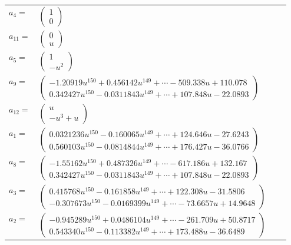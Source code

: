 \documentclass[1p]{elsarticle_modified}
\theoremstyle{definition}
\begin{document}
\begin{tabular}{m{7pt} m{180pt} m{7pt} m{180pt} }
\flushright $a_{4}=$&$\begin{pmatrix}1\\0\end{pmatrix}$ \\
\flushright $a_{11}=$&$\begin{pmatrix}0\\u\end{pmatrix}$ \\
\flushright $a_{5}=$&$\begin{pmatrix}1\\- u^2\end{pmatrix}$ \\
\flushright $a_{9}=$&$\begin{pmatrix}-1.20919 u^{150}+0.456142 u^{149}+\cdots-509.338 u+110.078\\0.342427 u^{150}-0.0311843 u^{149}+\cdots+107.848 u-22.0893\end{pmatrix}$ \\
\flushright $a_{12}=$&$\begin{pmatrix}u\\- u^3+u\end{pmatrix}$ \\
\flushright $a_{1}=$&$\begin{pmatrix}0.0321236 u^{150}-0.160065 u^{149}+\cdots+124.646 u-27.6243\\0.560103 u^{150}-0.0814844 u^{149}+\cdots+176.427 u-36.0766\end{pmatrix}$ \\
\flushright $a_{8}=$&$\begin{pmatrix}-1.55162 u^{150}+0.487326 u^{149}+\cdots-617.186 u+132.167\\0.342427 u^{150}-0.0311843 u^{149}+\cdots+107.848 u-22.0893\end{pmatrix}$ \\
\flushright $a_{3}=$&$\begin{pmatrix}0.415768 u^{150}-0.161858 u^{149}+\cdots+122.308 u-31.5806\\-0.307673 u^{150}-0.0169399 u^{149}+\cdots-73.6657 u+14.9648\end{pmatrix}$ \\
\flushright $a_{2}=$&$\begin{pmatrix}-0.945289 u^{150}+0.0486104 u^{149}+\cdots-261.709 u+50.8717\\0.543340 u^{150}-0.113382 u^{149}+\cdots+173.488 u-36.6489\end{pmatrix}$ \\

\end{tabular}
\end{document}
